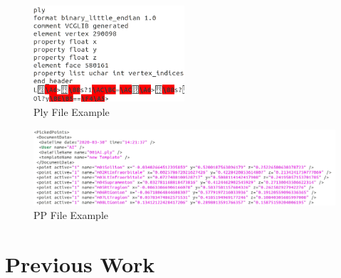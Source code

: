 \begin{figure}[h]
	\caption{Ply File Example}
	\centering
	\includegraphics[width=0.5\textwidth]{images/ply_file.png}
\end{figure}
\begin{figure}[h]
	\caption{PP File Example}
	\centering
	\includegraphics[width=1.1\textwidth]{images/pp_file.png}
\end{figure}



\chapter{Previous Work}

